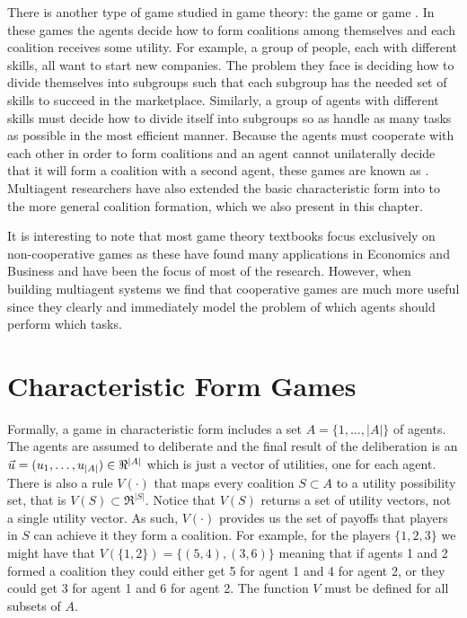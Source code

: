 There is another type of game studied in game theory: the
 game or  game
\cite{osborne99a}. In these games the agents decide how to form
coalitions among themselves and each coalition receives some utility.
For example, a group of people, each with different skills, all want
to start new companies.  The problem they face is deciding how to
divide themselves into subgroups such that each subgroup has the
needed set of skills to succeed in the marketplace.  Similarly, a
group of agents with different skills must decide how to divide itself
into subgroups so as handle as many tasks as possible in the most
efficient manner. Because the agents must cooperate with each other in
order to form coalitions and an agent cannot unilaterally decide that
it will form a coalition with a second agent, these games are known as
. Multiagent researchers have also extended the
basic characteristic form into to the more general coalition
formation, which we also present in this chapter.

It is interesting to note that most game theory textbooks focus
exclusively on non-cooperative games as these have found many
applications in Economics and Business and have been the focus of most
of the research. However, when building multiagent systems we find
that cooperative games are much more useful since they clearly and
immediately model the problem of which agents should perform which
tasks.

\section{Characteristic Form Games}
\label{sec:char-form-games}

Formally, a game in characteristic form includes a set $A =
\{1,\ldots, |A|\}$ of agents. The agents are assumed to deliberate and
the final result of the deliberation is an  $\vec{u} =
(u_1,\ldots,u_{|A|}) \in \Re^{|A|}$ which is just a vector of
utilities, one for each agent. There is also a rule $V(\cdot)$ that
maps every coalition $S \subset A$ to a utility possibility set, that
is $V(S) \subset \Re^{|S|}$. Notice that $V(S)$ returns a set of
utility vectors, not a single utility vector. As such, $V(\cdot)$
provides us the set of payoffs that players in $S$ can achieve it they
form a coalition. For example, for the players $\{1,2,3\}$ we might
have that $V(\{1,2\}) = \{(5,4),(3,6)\}$ meaning that if agents 1 and
2 formed a coalition they could either get 5 for agent 1 and 4 for
agent 2, or they could get 3 for agent 1 and 6 for agent 2. The
function $V$ must be defined for all subsets of $A$.

